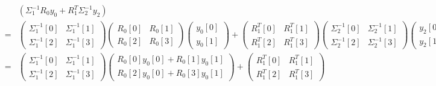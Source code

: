 \documentclass{article}
\begin{document}
\begin{landscape}
        \begin{eqnarray*}
            \!\!\!\!\!\!\!\!\!\!\!\!\!\!\!\!\!\!\!\!\!\!
            &&\left( \Sigma_1^{-1} R_0 y_0 + R_1^T \Sigma_2^{-1} y_2 \right)\\
            \!\!\!\!\!\!\!\!\!\!\!\!\!\!\!\!\!\!\!\!\!\!
            &=&
            \begin{pmatrix}
                \Sigma_1^{-1}[0] & \Sigma_1^{-1}[1]\\
                \Sigma_1^{-1}[2] & \Sigma_1^{-1}[3]
            \end{pmatrix}
            \begin{pmatrix}
                R_0[0] & R_0[1]\\
                R_0[2] & R_0[3]
            \end{pmatrix}
            \begin{pmatrix}
                y_0[0]\\
                y_0[1]
            \end{pmatrix}
            +
            \begin{pmatrix}
                R_1^T[0] & R_1^T[1]\\
                R_1^T[2] & R_1^T[3]
            \end{pmatrix}
            \begin{pmatrix}
                \Sigma_2^{-1}[0] & \Sigma_2^{-1}[1]\\
                \Sigma_2^{-1}[2] & \Sigma_2^{-1}[3]
            \end{pmatrix}
            \begin{pmatrix}
                y_2[0]\\
                y_2[1]
            \end{pmatrix}\\
            &=&
            \begin{pmatrix}
                \Sigma_1^{-1}[0] & \Sigma_1^{-1}[1]\\
                \Sigma_1^{-1}[2] & \Sigma_1^{-1}[3]
            \end{pmatrix}
            \begin{pmatrix}
                R_0[0]y_0[0] + R_0[1]y_0[1]\\
                R_0[2]y_0[0] + R_0[3]y_0[1]
            \end{pmatrix}
            +
            \begin{pmatrix}
                R_1^T[0] & R_1^T[1]\\
                R_1^T[2] & R_1^T[3]

\end{pmatrix}
\end{eqnarray*}
\end{landscape}
\end{document}
